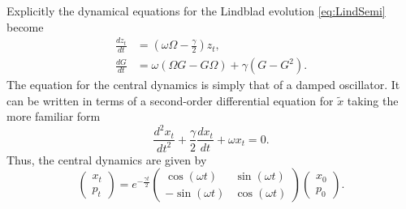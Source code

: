 \documentclass[12pt]{iopart} %
\begin{document}
Explicitly the dynamical equations for the Lindblad evolution \cref{eq:LindSemi} become
\begin{equation} 
    \begin{aligned} \label{eq:LindAnh}
    \frac{d  z_t}{d t} &= (\omega\Omega -\frac{\gamma}{2 }) z_t, \\
  	\frac{dG}{dt} &=\omega(\Omega G-G\Omega) +\gamma( G - G^2).
    \end{aligned}
\end{equation}
The equation for the central dynamics is simply that of a damped oscillator. It can be written in terms of a second-order differential equation for $\tilde x$ taking the more familiar form
\begin{equation}
\frac{d^2 x_t}{d t^2}+\frac{\gamma}{2 }\frac{d x_t}{dt}+\omega x_t=0.
\end{equation}
Thus, the central dynamics are given by 
\begin{equation}
    \begin{pmatrix} x_t\\p_t\end{pmatrix}=e^{-\frac{\gamma t}{2 }}\begin{pmatrix}\cos(\omega t) &\sin(\omega t)\\-\sin(\omega t)&\cos(\omega t)\end{pmatrix}\begin{pmatrix}x_0\\p_0 \end{pmatrix}.
\end{equation}
\end{document}
